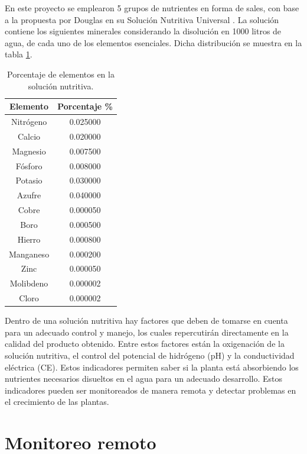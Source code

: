 En este proyecto se emplearon 5 grupos de nutrientes en forma de sales, con base a la propuesta por Douglas en su Solución Nutritiva Universal \cite{douglas1985advanced}.
La solución contiene los siguientes minerales considerando la disolución en 1000 litros de agua, de cada uno de los elementos esenciales. Dicha distribución se muestra en la tabla \ref{tab:t1}.
\begin{table}[htb!]
\centering
\caption{Porcentaje de elementos en la solución nutritiva.} 
\begin{tabular}{c c}
\hline
      Elemento & Porcentaje \%  \\
 \hline

Nitrógeno&0.025000\\
Calcio&0.020000\\
Magnesio&0.007500\\
Fósforo&0.008000\\
Potasio&0.030000\\
Azufre&0.040000\\
Cobre&0.000050\\
Boro&0.000500\\
Hierro&0.000800\\
Manganeso&0.000200\\
Zinc&0.000050\\
Molibdeno&0.000002\\
Cloro&0.000002\\
\hline
\end{tabular}
\label{tab:t1}
\end{table}

Dentro de una solución nutritiva hay factores que deben de tomarse en cuenta para un adecuado control y manejo, los cuales repercutirán directamente en la calidad del producto obtenido. Entre estos factores están la oxigenación de la solución nutritiva, el control del potencial de hidrógeno (pH) y la conductividad eléctrica (CE). Estos indicadores permiten saber si la planta está absorbiendo los nutrientes necesarios disueltos en el agua para un adecuado desarrollo. Estos indicadores pueden ser monitoreados de manera remota y detectar problemas en el crecimiento de las plantas.
\section{Monitoreo remoto}

